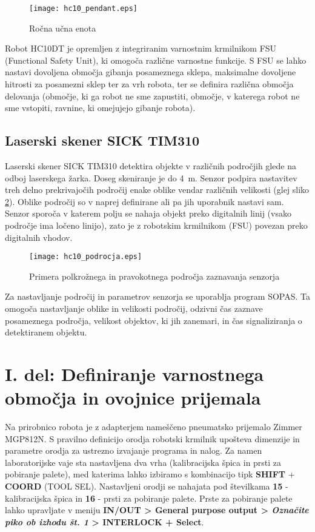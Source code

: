 \begin{figure}[!hbt]
	\centering
	\texttt{[image: hc10\_pendant.eps]}
	\caption{Ročna učna enota}
	\label{fig:hc10_pendant}
\end{figure}

Robot HC10DT je opremljen z integriranim varnostnim krmilnikom FSU (Functional Safety Unit), ki omogoča različne varnostne funkcije. S FSU se lahko nastavi dovoljena območja gibanja posameznega sklepa, maksimalne dovoljene hitrosti za posamezni sklep ter za vrh robota, ter se definira različna območja delovanja (območje, ki ga robot ne sme zapustiti, območje, v katerega robot ne sme vstopiti, ravnine, ki omejujejo gibanje robota).

\subsection{Laserski skener SICK TIM310}

Laserski skener SICK TIM310 detektira objekte v različnih področjih glede na odboj laserskega žarka. Doseg skeniranje je do 4~m. Senzor podpira nastavitev treh delno prekrivajočih področij enake oblike vendar različnih velikosti (glej sliko \ref{fig:hc10_sick}). Oblike področij so  v naprej definirane ali pa jih uporabnik nastavi sam. Senzor sporoča v katerem polju se nahaja objekt preko digitalnih linij (vsako področje ima ločeno linijo), zato je z robotskim krmilnikom (FSU) povezan preko digitalnih vhodov.

\begin{figure}[!hbt]
	\centering
	\texttt{[image: hc10\_podrocja.eps]}
	\caption{Primera polkrožnega in pravokotnega področja zaznavanja senzorja}
	\label{fig:hc10_sick}
\end{figure}

Za nastavljanje področij in parametrov senzorja se uporablja program SOPAS. Ta omogoča nastavljanje oblike in velikosti področij, odzivni čas zaznave posameznega področja, velikost objektov, ki jih zanemari, in čas signaliziranja o detektiranem objektu.

\section{I. del: Definiranje varnostnega območja in ovojnice prijemala}

Na prirobnico robota je z adapterjem nameščeno pneumatsko prijemalo Zimmer MGP812N. S pravilno definicijo orodja robotski krmilnik upošteva dimenzije in parametre orodja za ustrezno izvajanje programa in nalog. Za namen laboratorijske vaje sta nastavljena dva vrha (kalibracijska špica in prsti za pobiranje palete), med katerima lahko izbiramo s kombinacijo tipk \textbf{SHIFT} + \textbf{COORD} (TOOL SEL). Nastavljeni orodji se nahajata pod številkama \textbf{15} - kalibracijska špica in \textbf{16} - prsti za pobiranje palete. Prste za pobiranje palete lahko upravljate v meniju \textbf{IN/OUT > General purpose output > \textit{Označite piko ob izhodu št. 1} > INTERLOCK + Select}.

